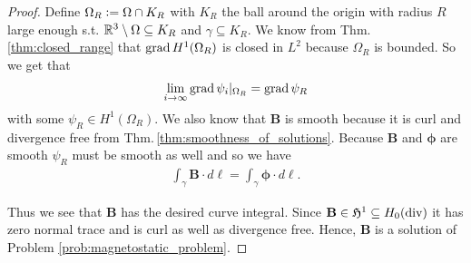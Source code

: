 \documentclass[../master_thesis.tex]{subfiles}
\begin{document}
\begin{proof}
    Define $\Omega_R \vcentcolon= \Omega \cap K_R$ with $K_R$ the ball around the origin 
    with radius $R$ large enough s.t. $\mathbb{R}^3 \setminus \Omega \subseteq K_R$ and 
    $\gamma \subseteq K_R$. 
    We know from Thm.\,\ref{thm:closed_range} 
    that $\operatorname{grad} H^1(\Omega_R)$ is closed in $L^2$ because $\Omega_R$ is bounded. 
    So we get that 
    \begin{align*}
        \lim\limits_{i\rightarrow \infty}\operatorname{grad} \psi_i|_{\Omega_R} = \operatorname{grad} \psi_R
    \end{align*}
    with some $\psi_R \in H^1(\Omega_R)$. We also know that $\mathbf{B}$ is smooth because 
    it is curl and divergence free from Thm.\,\ref{thm:smoothness_of_solutions}. 
    Because $\mathbf{B}$ and $\bm{\phi}$ are smooth
    $\psi_R$ must be smooth as well and so we have   
    \begin{align*}
        \int_\gamma \mathbf{B}\cdot d\ell = \int_\gamma \bm{\phi}\cdot d\ell.
    \end{align*}

    Thus we see that $\mathbf{B}$ has the desired curve integral. Since 
    $\mathbf{B} \in \mathfrak{H}^1 \subseteq H_0(\operatorname{div})$ it has zero normal trace 
    and is curl as well as divergence free. Hence, $\mathbf{B}$ is a solution of Problem 
    \ref{prob:magnetostatic_problem}.
\end{proof}
\end{document}
